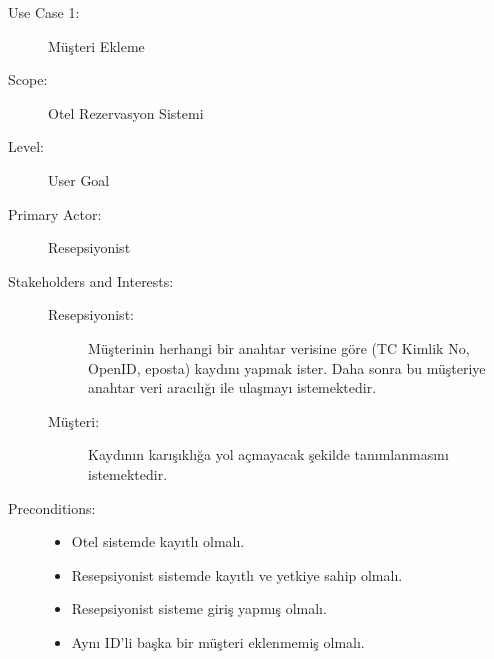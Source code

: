 \documentclass[12pt,a4paper]{report}
\begin{document}
\newpage

\begin{description}
\item[Use Case 1:] Müşteri Ekleme \\
\item[Scope:] Otel Rezervasyon Sistemi
\item[Level:] User Goal
\item[Primary Actor:] Resepsiyonist 
\item[Stakeholders and Interests:] \hspace{10 mm}
\begin{description} 
\item[Resepsiyonist:] Müşterinin herhangi bir anahtar verisine göre 
(TC Kimlik No, OpenID, eposta) kaydını yapmak ister. Daha sonra bu 
müşteriye anahtar veri aracılığı ile ulaşmayı istemektedir.
\item[Müşteri:] Kaydının karışıklığa yol açmayacak şekilde tanımlanmasını istemektedir.
\end{description}
\item[Preconditions:] \hspace{10mm}
\begin{itemize}
\item Otel sistemde kayıtlı olmalı.
\item Resepsiyonist sistemde kayıtlı ve yetkiye sahip olmalı.
\item Resepsiyonist sisteme giriş yapmış olmalı.
\item Aynı ID'li başka bir müşteri eklenmemiş olmalı.
\end{itemize}


\end{description}
\end{document}
